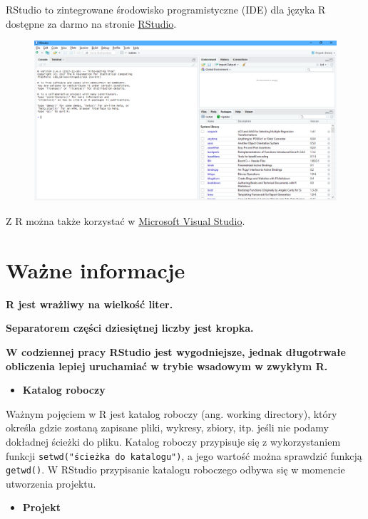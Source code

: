 \documentclass[]{book}
\providecommand{\tightlist}{%
  \setlength{\itemsep}{0pt}\setlength{\parskip}{0pt}}
\begin{document}
RStudio to zintegrowane środowisko programistyczne (IDE) dla języka R
dostępne za darmo na stronie
\href{https://www.rstudio.com/products/rstudio/download/}{RStudio}.

\begin{figure}
\centering
\includegraphics{img/rstudio.png}
\caption{}
\end{figure}

Z R można także korzystać w
\href{https://www.visualstudio.com/pl/vs/rtvs/}{Microsoft Visual
Studio}.

\section{Ważne informacje}\label{wazne-informacje}

\textbf{R jest wrażliwy na wielkość liter.}

\textbf{Separatorem części dziesiętnej liczby jest kropka.}

\textbf{W codziennej pracy RStudio jest wygodniejsze, jednak długotrwałe
obliczenia lepiej uruchamiać w trybie wsadowym w zwykłym R.}

\begin{itemize}
\tightlist
\item
  \textbf{Katalog roboczy}
\end{itemize}

Ważnym pojęciem w R jest katalog roboczy (ang. working directory), który
określa gdzie zostaną zapisane pliki, wykresy, zbiory, itp. jeśli nie
podamy dokładnej ścieżki do pliku. Katalog roboczy przypisuje się z
wykorzystaniem funkcji \texttt{setwd("ścieżka\ do\ katalogu")}, a jego
wartość można sprawdzić funkcją \texttt{getwd()}. W RStudio przypisanie
katalogu roboczego odbywa się w momencie utworzenia projektu.

\begin{itemize}
\tightlist
\item
  \textbf{Projekt}
\end{itemize}
\end{document}
